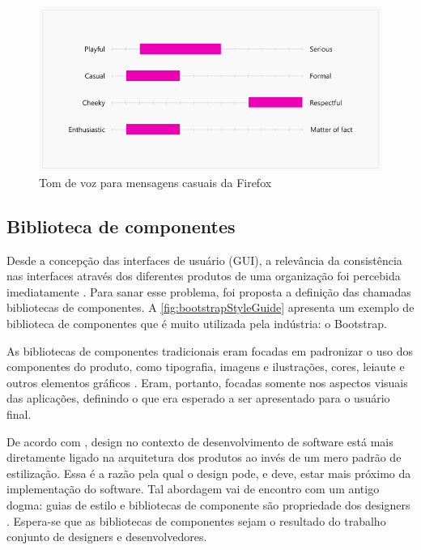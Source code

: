\begin{figure}
	\includegraphics[width=\linewidth]{./04-figuras/02_referencial_teorico/firefox-tone-voice-02.png}
	\caption{Tom de voz para mensagens casuais da Firefox}
  \label{fig:firefoxVoiceTonePlayful}
\end{figure}

\subsection{Biblioteca de componentes}
\label{sec:bibliotecaComponentes}

Desde a concepção das interfaces de usuário (GUI), a relevância da consistência nas interfaces através dos diferentes produtos de uma organização foi percebida imediatamente \cite{ruissalo2018operating}. Para sanar esse problema, foi proposta a definição das chamadas bibliotecas de componentes. A \autoref{fig:bootstrapStyleGuide} apresenta um exemplo de biblioteca de componentes que é muito utilizada pela indústria: o Bootstrap.

As bibliotecas de componentes tradicionais eram focadas em padronizar o uso dos componentes do produto, como tipografia, imagens e ilustrações, cores, leiaute e outros elementos gráficos \cite{ruissalo2018operating}. Eram, portanto, focadas somente nos aspectos visuais das aplicações, definindo o que era esperado a ser apresentado para o usuário final.

De acordo com \cite{taylor2007software}, design no contexto de desenvolvimento de software está mais diretamente ligado na arquitetura dos produtos ao invés de um mero padrão de estilização. Essa é a razão pela qual o design pode, e deve, estar mais próximo da implementação do software. Tal abordagem vai de encontro com um antigo dogma: guias de estilo e bibliotecas de componente são propriedade dos designers \cite{ruissalo2018operating}. Espera-se que as bibliotecas de componentes sejam o resultado do trabalho conjunto de designers e desenvolvedores.

